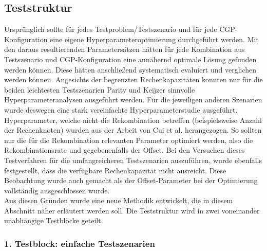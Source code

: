 \subsection{Teststruktur}
\label{subsec:struktur}

Ursprünglich sollte für jedes Testproblem/Testszenario und für jede CGP-Konfiguration eine eigene Hyperparameteroptimierung durchgeführt werden.
Mit den daraus resultierenden Parametersätzen hätten für jede Kombination aus Testszenario und CGP-Konfiguration eine annähernd optimale Lösung gefunden werden können.
Diese hätten anschließend systematisch evaluiert und verglichen werden können.
Angesichts der begrenzten Rechenkapazitäten konnten nur für die beiden leichtesten Testszenarien Parity und Keijzer sinnvolle Hyperparameteranalysen ausgeführt werden.
Für die jeweiligen anderen Szenarien wurde deswegen eine stark vereinfachte Hyperparameterstudie ausgeführt.
Hyperparameter, welche nicht die Rekombination betreffen (beispielsweise Anzahl der Rechenknoten) wurden aus der Arbeit von Cui et al. \cite{cui_results} herangezogen.
So sollten nur die für die Rekombination relevanten Parameter optimiert werden, also die Rekombinationsrate und gegebenenfalls der Offset.
Bei den Versuchen dieses Testverfahren für die umfangreicheren Testszenarien auszuführen, wurde ebenfalls festgestellt, dass die verfügbare Rechenkapazität nicht ausreicht.
Diese Beobachtung wurde auch gemacht als der Offset-Parameter bei der Optimierung vollständig ausgeschlossen wurde.\\
Aus diesen Gründen wurde eine neue Methodik entwickelt, die in diesem Abschnitt näher erläutert werden soll.
Die Teststruktur wird in zwei voneinander unabhängige Testblöcke geteilt.

\subsubsection{1. Testblock: einfache Testszenarien}
\label{subsub:ersterTestblock}

